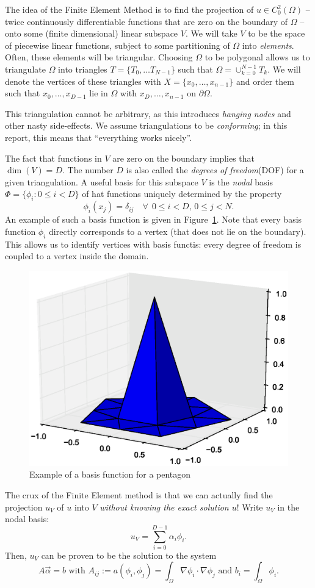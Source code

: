 \documentclass[11pt]{amsart}
\theoremstyle{definition}
\begin{document}
The idea of the Finite Element Method is to find the projection of $u \in C^2_0(\Omega)$ -- twice continuously differentiable functions that are zero on the boundary of $\Omega$ -- onto some (finite dimensional) linear subspace $V$. We will take $V$ to be the space of piecewise linear functions, subject to some partitioning of $\Omega$ into \emph{elements}. Often, these elements will be triangular. Choosing $\Omega$ to be polygonal allows us to triangulate $\Omega$ into triangles $T = \{ T_0, \ldots T_{N-1}\}$ such that $\Omega = \cup_{k = 0}^{N-1}T_k$. We will denote the vertices of these triangles with $X = \{x_0, \ldots, x_{n-1}\}$ and order them such that $x_0, \ldots, x_{D-1}$ lie in $\Omega$ with $x_{D}, \ldots, x_{n-1}$ on $\partial \Omega$.

This triangulation cannot be arbitrary, as this introduces \emph{hanging nodes} and other nasty side-effects. We assume triangulations to be \emph{conforming}; in this report, this means that ``everything works nicely''.

The fact that functions in $V$ are zero on the boundary implies that $\dim(V) = D$. The number $D$ is also called the \emph{degrees of freedom}(DOF) for a given triangulation. A useful basis for this subspace $V$ is the \emph{nodal} basis $\Phi = \{\phi_i: 0 \leq i < D\}$ of hat functions uniquely determined by the property
\[
  \phi_i( x_j) = \delta_{ij} \quad \forall~~0 \leq i < D,\, 0 \leq j < N.
\] An example of such a basis function is given in Figure~\ref{fig:nodal}. Note that every basis function $\phi_i$ directly corresponds to a vertex (that does not lie on the boundary). This allows us to identify vertices with basis functis: every degree of freedom is coupled to a vertex inside the domain.
\begin{figure}[h!]
	\centering
	\includegraphics[width=0.5\linewidth]{nodal_vijfhoek.eps}
\caption{Example of a basis function for a pentagon}
\label{fig:nodal}
\end{figure}


The crux of the Finite Element method is that we can actually find the projection $u_V$ of $u$ into $V$ \emph{without knowing the exact solution $u$}! Write $u_V$ in the nodal basis:
\[
  u_V = \sum_{i=0}^{D-1} \alpha_i \phi_i.
\]
Then, $u_V$ can be proven \cite{TODO} to be the solution to the system
\[
	A\vec \alpha = b \text{ with }  A_{ij} := a(\phi_i, \phi_j) = \int_\Omega \nabla \phi_i \cdot \nabla \phi_j \text{ and } b_i = \int_\Omega \phi_i.
\]
\end{document}
